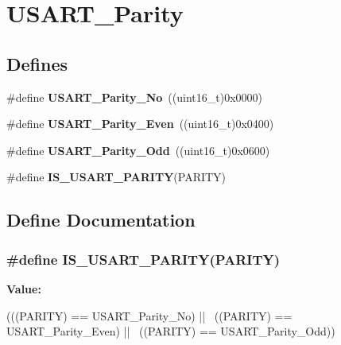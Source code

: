 \hypertarget{group__USART__Parity}{
\section{USART\_\-Parity}
\label{group__USART__Parity}
}
\subsection*{Defines}
\begin{DoxyCompactItemize}
\item 
\hypertarget{group__USART__Parity_gab9deebcb0a859360dfec85074abaa3aa}{
\#define {\bfseries USART\_\-Parity\_\-No}~((uint16\_\-t)0x0000)}
\label{group__USART__Parity_gab9deebcb0a859360dfec85074abaa3aa}

\item 
\hypertarget{group__USART__Parity_ga62193247d36fffe982e159c1f246271e}{
\#define {\bfseries USART\_\-Parity\_\-Even}~((uint16\_\-t)0x0400)}
\label{group__USART__Parity_ga62193247d36fffe982e159c1f246271e}

\item 
\hypertarget{group__USART__Parity_gafcd68937a6b4b8ffff8f96e68d6a5ecd}{
\#define {\bfseries USART\_\-Parity\_\-Odd}~((uint16\_\-t)0x0600)}
\label{group__USART__Parity_gafcd68937a6b4b8ffff8f96e68d6a5ecd}

\item 
\#define {\bfseries IS\_\-USART\_\-PARITY}(PARITY)
\end{DoxyCompactItemize}


\subsection{Define Documentation}
\hypertarget{group__USART__Parity_gaa87b2e338e0ccc42887d3c56901bee87}{
\subsubsection[{IS\_\-USART\_\-PARITY}]{\setlength{\rightskip}{0pt plus 5cm}\#define IS\_\-USART\_\-PARITY(PARITY)}}
\label{group__USART__Parity_gaa87b2e338e0ccc42887d3c56901bee87}
{\bfseries Value:}
\begin{DoxyCode}
(((PARITY) == USART_Parity_No) || \
                                 ((PARITY) == USART_Parity_Even) || \
                                 ((PARITY) == USART_Parity_Odd))
\end{DoxyCode}
